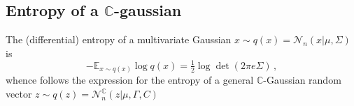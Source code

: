 \documentclass[a4paper,10pt]{article}
\newcommand{\cplx}{\mathbb{C}}
\begin{document}

\subsection{Entropy of a $\cplx$-gaussian} %
\label{sub:entropy_of_a_c_gaussian}

The (differential) entropy of a multivariate Gaussian $
  x \sim q(x) = \mathcal{N}_n(x \vert \mu, \Sigma)
$ is
$$
- \mathbb{E}_{x\sim q(x)} \log q(x)
  = \tfrac12 \log \det{(2 \pi e \Sigma)}
  \,, $$
whence follows the expression for the entropy of a general $\cplx$-Gaussian random vector
$
  z \sim q(z)
    = \mathcal{N}^{\cplx}_n(z\vert \mu, \Gamma, C)
$
\end{document}
